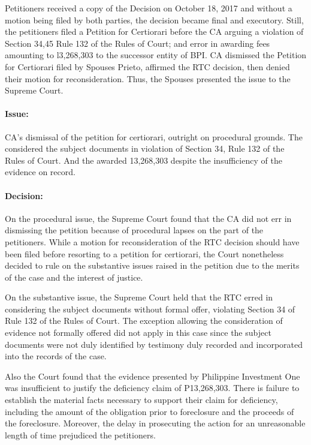 \documentclass[
12pt,
oneside,
onehalfspacing,
headsepline
]{DigestCollection}
\begin{document}
Petitioners received a copy of the Decision on October 18, 2017 and without a motion being filed by both parties, the decision became final and executory. Still, the petitioners filed a Petition for Certiorari before the CA arguing a violation of Section 34,45 Rule 132 of the Rules of Court; and error in awarding fees amounting to l3,268,303 to the successor entity of BPI. CA dismissed the Petition for Certiorari filed by Spouses Prieto, affirmed the RTC decision, then denied their motion for reconsideration. Thus, the Spouses presented the issue to the Supreme Court.

\paragraph{Issue:}
\label{a8b5b030-09fd-11ef-932c-63c852f65e48}


CA's dismissal of the petition for certiorari, outright on procedural grounds. The considered the subject documents in violation of Section 34, Rule 132 of the Rules of Court. And the awarded 13,268,303 despite the insufficiency of the evidence on record.

\paragraph{Decision:}
\label{aa387fa0-09fd-11ef-932c-63c852f65e48}


On the procedural issue, the Supreme Court found that the CA did not err in dismissing the petition because of procedural lapses on the part of the petitioners. While a motion for reconsideration of the RTC decision should have been filed before resorting to a petition for certiorari, the Court nonetheless decided to rule on the substantive issues raised in the petition due to the merits of the case and the interest of justice.

On the substantive issue, the Supreme Court held that the RTC erred in considering the subject documents without formal offer, violating Section 34 of Rule 132 of the Rules of Court. The exception allowing the consideration of evidence not formally offered did not apply in this case since the subject documents were not duly identified by testimony duly recorded and incorporated into the records of the case.

Also the Court found that the evidence presented by Philippine Investment One was insufficient to justify the deficiency claim of P13,268,303. There is failure to establish the material facts necessary to support their claim for deficiency, including the amount of the obligation prior to foreclosure and the proceeds of the foreclosure. Moreover, the delay in prosecuting the action for an unreasonable length of time prejudiced the petitioners.
\end{document}
